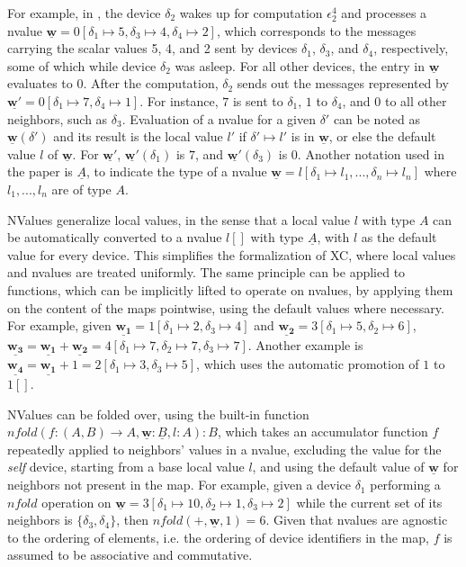 For example, in , the device $\delta_2$ wakes up for computation $\epsilon_2^4$ and processes a nvalue $\underline{\mathbf{w}} = 0[\delta_1 \mapsto 5, \delta_3 \mapsto 4, \delta_4 \mapsto 2]$, which corresponds to the messages carrying the scalar values 5, 4, and 2 sent by devices $\delta_1$, $\delta_3$, and $\delta_4$, respectively, some of which while device $\delta_2$ was asleep.
%
For all other devices, the entry in $\underline{\mathbf{w}}$ evaluates to $0$.
%
After the computation, $\delta_2$ sends out the messages represented by $\underline{\mathbf{w'}} = 0[\delta_1 \mapsto 7, \delta_4 \mapsto 1]$.
%
For instance, $7$ is sent to $\delta_1$, $1$ to $\delta_4$, and $0$ to all other neighbors, such as $\delta_3$.
%
Evaluation of a nvalue for a given $\delta'$ can be noted as $\underline{\mathbf{w}}(\delta')$ and its result is the local value $l'$ if $\delta' \mapsto l'$ is in $\underline{\mathbf{w}}$, or else the default value $l$ of $\underline{\mathbf{w}}$.
%
For $\underline{\mathbf{w'}}$, $\underline{\mathbf{w'}}(\delta_1)$ is $7$, and $\underline{\mathbf{w'}}(\delta_3)$ is 0.
%
Another notation used in the paper is $\underline{A}$, to indicate the type of a nvalue $\underline{\mathbf{w}} = l[\delta_1 \mapsto l_1, ..., \delta_n \mapsto l_n]$ where $l_1, ..., l_n$ are of type $A$\cite{xc}.

NValues generalize local values, in the sense that a local value $l$ with type $A$ can be automatically converted to a nvalue $l[]$ with type $\underline{A}$, with $l$ as the default value for every device\cite{xc}.
%
This simplifies the formalization of \ac{XC}, where local values and nvalues are treated uniformly\cite{xc}.
%
The same principle can be applied to functions, which can be implicitly lifted to operate on nvalues, by applying them on the content of the maps pointwise, using the default values where necessary\cite{xc}.
%
For example, given $\underline{\mathbf{w_1}} = 1[\delta_1 \mapsto 2, \delta_3 \mapsto 4]$ and $\underline{\mathbf{w_2}} = 3[\delta_1 \mapsto 5, \delta_2 \mapsto 6]$, $\underline{\mathbf{w_3}} = \underline{\mathbf{w_1}} + \underline{\mathbf{w_2}} = 4[\delta_1 \mapsto 7, \delta_2 \mapsto 7, \delta_3 \mapsto 7]$.
%
Another example is $\underline{\mathbf{w_4}} = \underline{\mathbf{w_1}} + 1 = 2[\delta_1 \mapsto 3, \delta_3 \mapsto 5]$, which uses the automatic promotion of $1$ to $1[]$.

NValues can be folded over, using the built-in function $nfold(f : (A, B) \rightarrow A, \underline{\mathbf{w}} : \underline{B}, l : A) : B$, which takes an accumulator function $f$ repeatedly applied to neighbors' values in a nvalue, excluding the value for the \textit{self} device, starting from a base local value $l$, and using the default value of $\underline{\mathbf{w}}$ for neighbors not present in the map\cite{xc}.
%
For example, given a device $\delta_1$ performing a $nfold$ operation on $\underline{\mathbf{w}} = 3[\delta_1 \mapsto 10, \delta_2 \mapsto 1, \delta_3 \mapsto 2]$ while the current set of its neighbors is $\{\delta_3, \delta_4\}$, then $nfold(+, \underline{\mathbf{w}}, 1) = 6$.
%
Given that nvalues are agnostic to the ordering of elements, i.e. the ordering of device identifiers in the map, $f$ is assumed to be associative and commutative\cite{xc}.

